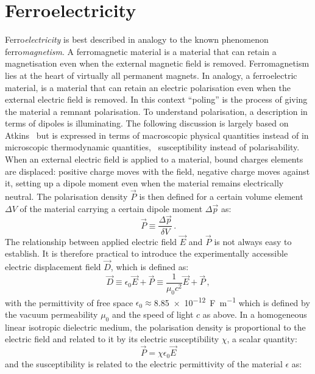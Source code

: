 \section{Ferroelectricity}
Ferro\emph{electricity} is best described in analogy to the known phenomenon ferro\emph{magnetism}. A ferromagnetic material is a material that can retain a magnetisation even when the external magnetic field is removed. Ferromagnetism lies at the heart of virtually all permanent magnets. In analogy, a ferroelectric material, is a material that can retain an electric polarisation even when the external electric field is removed. In this context \enquote{poling} is the process of giving the material a remnant polarisation. To understand polarisation, a description in terms of dipoles is illuminating. The following discussion is largely based on Atkins~\cite[Chapters 18.1 to 18.3 and 20.10]{atkins} but is expressed in terms of macroscopic physical quantities instead of in microscopic thermodynamic quantities,~\eg{} susceptibility instead of polarisability. When an external electric field is applied to a material, bound charges elements are displaced: positive charge moves with the field, negative charge moves against it, setting up a dipole moment even when the material remains electrically neutral. The polarisation density $\vec{P}$ is then defined for a certain volume element $\Delta V$ of the material carrying a certain dipole moment $\Delta \vec{p}$ as:
\begin{equation}
	\vec{P} \equiv \frac{\Delta \vec{p}}{\delta V} \, .
\end{equation}
The relationship between applied electric field $\vec{E}$ and $\vec{P}$ is not always easy to establish. It is therefore practical to introduce the experimentally accessible electric displacement field $\vec{D}$, which is defined as:
\begin{equation}
	\vec{D} \equiv \epsilon_0 \vec{E} + \vec{P} \equiv \frac{1}{\mu _0 c^2} \vec{E} + \vec{P} \, ,
\end{equation}
with the permittivity of free space $\epsilon _0 \approx$\SI{8.85e-12}{\farad\per\metre} which is defined by the vacuum permeability $\mu _0$ and the speed of light $c$ as above. In a homogeneous linear isotropic dielectric medium, the polarisation density is proportional to the electric field and related to it by its electric susceptibility $\chi$, a scalar quantity:
\begin{equation}
	\vec{P} = \chi \epsilon_0 \vec{E}
\end{equation}
and the susceptibility is related to the electric permittivity of the material $\epsilon$ as:
